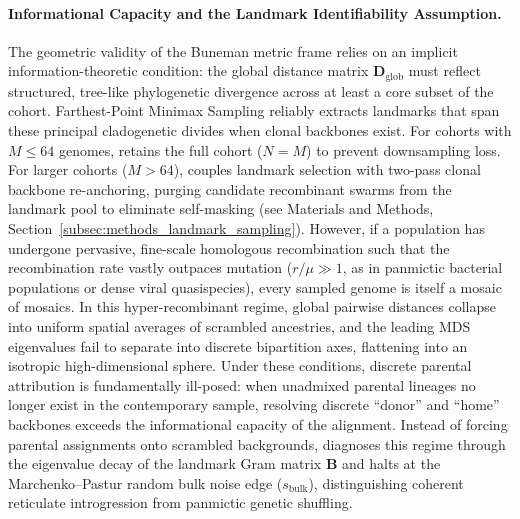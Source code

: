 \paragraph{Informational Capacity and the Landmark Identifiability Assumption.}
The geometric validity of the Buneman metric frame relies on an implicit information-theoretic condition: the global distance matrix $\mathbf{D}_{\text{glob}}$ must reflect structured, tree-like phylogenetic divergence across at least a core subset of the cohort.
Farthest-Point Minimax Sampling reliably extracts landmarks that span these principal cladogenetic divides when clonal backbones exist.
For cohorts with $M \le 64$ genomes, \RhizAeon retains the full cohort ($N = M$) to prevent downsampling loss.
For larger cohorts ($M > 64$), \RhizAeon couples landmark selection with two-pass clonal backbone re-anchoring, purging candidate recombinant swarms from the landmark pool to eliminate self-masking (see Materials and Methods, Section~\ref{subsec:methods_landmark_sampling}).
However, if a population has undergone pervasive, fine-scale homologous recombination such that the recombination rate vastly outpaces mutation ($r/\mu \gg 1$, as in panmictic bacterial populations or dense viral quasispecies), every sampled genome is itself a mosaic of mosaics.
In this hyper-recombinant regime, global pairwise distances collapse into uniform spatial averages of scrambled ancestries, and the leading MDS eigenvalues fail to separate into discrete bipartition axes, flattening into an isotropic high-dimensional sphere.
Under these conditions, discrete parental attribution is fundamentally ill-posed: when unadmixed parental lineages no longer exist in the contemporary sample, resolving discrete ``donor'' and ``home'' backbones exceeds the informational capacity of the alignment.
Instead of forcing parental assignments onto scrambled backgrounds, \RhizAeon diagnoses this regime through the eigenvalue decay of the landmark Gram matrix $\mathbf{B}$ and halts at the Marchenko--Pastur random bulk noise edge ($s_{\text{bulk}}$), distinguishing coherent reticulate introgression from panmictic genetic shuffling.

